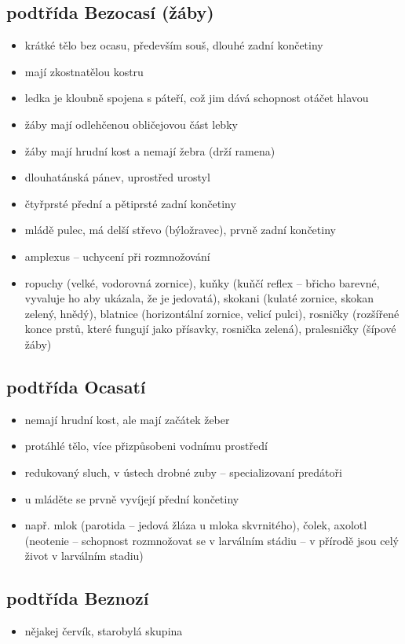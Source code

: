 \documentclass{article}
\begin{document}
\subsection{podtřída Bezocasí (žáby)}
\begin{itemize}
  \item krátké tělo bez ocasu, především souš, dlouhé zadní končetiny
  \item mají zkostnatělou kostru
  \item ledka je kloubně spojena s páteří, což jim dává schopnost otáčet hlavou
  \item žáby mají odlehčenou obličejovou část lebky
  \item žáby mají hrudní kost a nemají žebra (drží ramena)
  \item dlouhatánská pánev, uprostřed urostyl
  \item čtyřprsté přední a pětiprsté zadní končetiny
  \item mládě pulec, má delší střevo (býložravec), prvně zadní končetiny
  \item amplexus -- uchycení při rozmnožování
  \item ropuchy (velké, vodorovná zornice), kuňky (kuňčí reflex -- břicho barevné, vyvaluje ho aby ukázala, že je jedovatá), skokani (kulaté zornice, skokan zelený, hnědý), blatnice (horizontální zornice, velicí pulci), rosničky (rozšířené konce prstů, které fungují jako přísavky, rosnička zelená), pralesničky (šípové žáby)
\end{itemize}

\subsection{podtřída Ocasatí}
\begin{itemize}
  \item nemají hrudní kost, ale mají začátek žeber
  \item protáhlé tělo, více přizpůsobeni vodnímu prostředí
  \item redukovaný sluch, v ústech drobné zuby -- specializovaní predátoři
  \item u mláděte se prvně vyvíjejí přední končetiny
  \item např. mlok (parotida -- jedová žláza u mloka skvrnitého), čolek, axolotl (neotenie -- schopnost rozmnožovat se v larválním stádiu -- v přírodě jsou celý život v larválním stadiu)
\end{itemize}

\subsection{podtřída Beznozí}
\begin{itemize}
  \item nějakej červík, starobylá skupina
\end{itemize}
\end{document}
